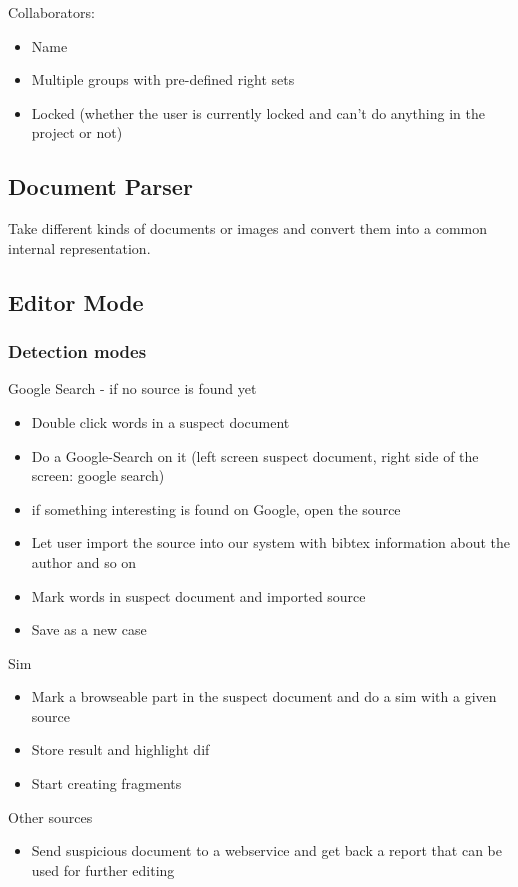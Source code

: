 Collaborators:
\begin{itemize}
\item Name
\item Multiple groups with pre-defined right sets
\item Locked (whether the user is currently locked and can't do anything in the project or not)
\end{itemize}


\subsection{ Document Parser}

Take different kinds of documents or images and convert them into a common internal representation.

\subsection{ Editor Mode}

\subsubsection{ Detection modes}

Google Search - if no source is found yet
\begin{itemize}
\item Double click words in a suspect document
\item Do a Google-Search on it (left screen suspect document, right side of the screen: google search)
\item if something interesting is found on Google, open the source
\item Let user import the source into our system with bibtex information about the author and so on
\item Mark words in suspect document and imported source
\item Save as a new case
\end{itemize}

Sim
\begin{itemize}
\item Mark a browseable part in the suspect document and do a sim with a given source
\item Store result and highlight dif
\item Start creating fragments
\end{itemize}

Other sources
\begin{itemize}
\item Send suspicious document to a webservice and get back a report that can be used for further editing 
\end{itemize}

